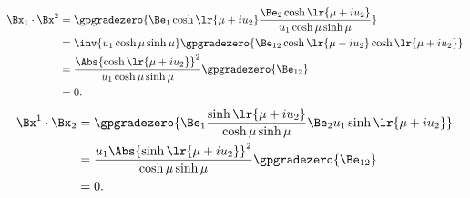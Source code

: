 {\begin{equation}
\begin{aligned}
\Bx_1 \cdot \Bx^2
&=
\gpgradezero{
\Be_1 \cosh\lr{ \mu + i u_2 }
\frac{ \Be_2 \cosh\lr{ \mu + i u_2 } }{ u_1 \cosh \mu \sinh \mu}
} \\
&=
\inv{ u_1 \cosh \mu \sinh \mu}
\gpgradezero{
   \Be_{12} \cosh\lr{ \mu - i u_2 } \cosh\lr{ \mu + i u_2 }
} \\
&=
\frac{ \Abs{ \cosh\lr{ \mu + i u_2 } }^2 }
{ u_1 \cosh \mu \sinh \mu}
\gpgradezero{
   \Be_{12}
} \\
&= 0.
\end{aligned}
\end{equation}
\begin{equation}\label{eqn:ellipticproblem:400}
\begin{aligned}
\Bx^1 \cdot \Bx_2
&=
\gpgradezero{
\Be_1 \frac{\sinh\lr{ \mu + i u_2 }}{\cosh \mu \sinh \mu}
\Be_2 u_1 \sinh\lr{ \mu + i u_2 }
} \\
&=
\frac{ u_1 \Abs{\sinh\lr{ \mu + i u_2 }}^2 }{\cosh \mu \sinh \mu} \gpgradezero{ \Be_{12} } \\
&= 0.
\end{aligned}
\end{equation}
} %
